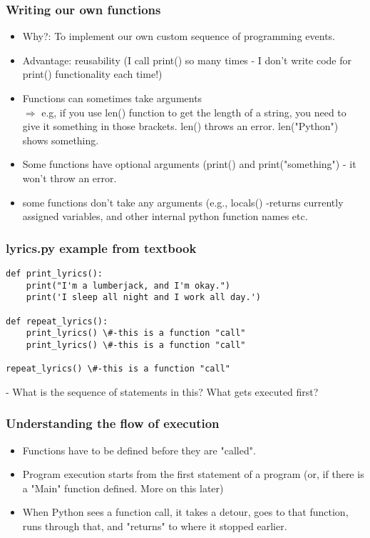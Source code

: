\documentclass{beamer}
\begin{document}
\begin{frame}
\frametitle{Writing our own functions}
\begin{itemize}
\item Why?: To implement our own custom sequence of programming events.
\item Advantage: reusability (I call print() so many times - I don't write code for print() functionality each time!)  \pause
\item Functions can sometimes take arguments
\\ $\Rightarrow$ e.g, if you use len() function to get the length of a string, you need to give it something in those brackets. len() throws an error. len("Python") shows something. \pause
\item Some functions have optional arguments (print() and print("something") - it won't throw an error. \pause
\item some functions don't take any arguments (e.g., locals() -returns currently assigned variables, and other internal python function names etc. 
\end{itemize}
\end{frame}

\begin{frame}[fragile]
\frametitle{lyrics.py example from textbook}
\scriptsize
\begin{verbatim}
def print_lyrics():
    print("I'm a lumberjack, and I'm okay.")
    print('I sleep all night and I work all day.')

def repeat_lyrics():
    print_lyrics() \#-this is a function "call"
    print_lyrics() \#-this is a function "call"

repeat_lyrics() \#-this is a function "call"
\end{verbatim}
\small - What is the sequence of statements in this? What gets executed first?
\end{frame}

\begin{frame}
\frametitle{Understanding the flow of execution}
\begin{itemize}
\item Functions have to be defined before they are "called".
\item Program execution starts from the first statement of a program (or, if there is a "Main" function defined. More on this later)
\item When Python sees a function call, it takes a detour, goes to that function, runs through that, and "returns" to where it stopped earlier.
\end{itemize}
\end{frame}
\end{document}
